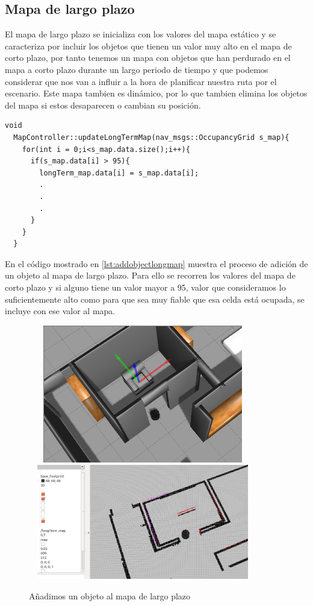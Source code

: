 \subsection{Mapa de largo plazo}
El mapa de largo plazo se inicializa con los valores del mapa estático y se caracteriza por incluir los objetos que tienen un valor muy alto en el mapa de corto plazo, por tanto tenemos un mapa con objetos que han perdurado en el mapa a corto plazo durante un largo periodo de tiempo y que podemos considerar que nos van a influir a la hora de planificar nuestra ruta por el escenario. 
Este mapa tambien es dinámico, por lo que tambien elimina los objetos del mapa si estos desaparecen o cambian su posición.
\pagebreak 

\begin{lstlisting}[caption=Procedimiento para añadir un objeto al mapa de largo plazo, label={lst:addobjectlongmap}]
  void
  MapController::updateLongTermMap(nav_msgs::OccupancyGrid s_map){
    for(int i = 0;i<s_map.data.size();i++){
      if(s_map.data[i] > 95){
        longTerm_map.data[i] = s_map.data[i]; 
        .
        .
        .
      }
    }
  }

\end{lstlisting}

En el código mostrado en \ref{lst:addobjectlongmap} muestra el proceso de adición de un objeto al mapa de largo plazo. Para ello se recorren los valores del mapa de corto plazo y si alguno tiene un valor mayor a 95, valor que consideramos lo suficientemente alto como para que sea muy fiable que esa celda está ocupada, se incluye con ese valor al mapa.

\begin{figure}[H]
  \begin{center}
    \includegraphics[width=10cm,height=6cm]{img/cap4/addingobject-gazebo}
    \includegraphics[width=10cm,height=5cm]{img/cap4/addingobject-longmap}
  \end{center}
  \caption{Añadimos un objeto al mapa de largo plazo}
  \label{fig:addobjectlongmap}
\end{figure}
\pagebreak


